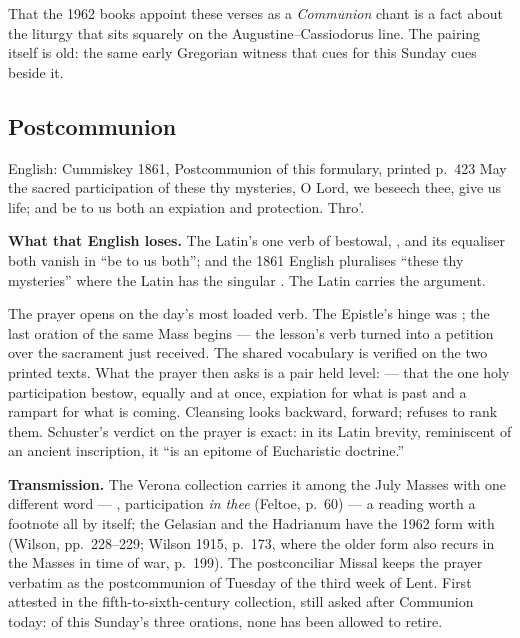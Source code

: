 That the 1962 books appoint these verses as a \textit{Communion} chant is a
fact about the liturgy that sits squarely on the Augustine--Cassiodorus line.
The pairing itself is old: the same early Gregorian witness
that cues  for this Sunday cues  beside it.

\elementguard
\subsection*{Postcommunion }


\begin{namedtranslation}{English: Cummiskey 1861, Postcommunion of this formulary, printed p.~423}
May the sacred participation of these thy mysteries, O Lord, we beseech thee,
give us life; and be to us both an expiation and protection. Thro'.
\end{namedtranslation}

\textbf{What that English loses.} The Latin's one verb of bestowal,
, and its equaliser  both vanish in ``be to us
both''; and the 1861 English pluralises ``these thy mysteries'' where the
Latin has the singular . The Latin carries the
argument.

The prayer opens on the day's most loaded verb. The Epistle's hinge was
; the last oration of the same Mass begins
 --- the lesson's verb turned into a petition over the
sacrament just received. The shared vocabulary is verified on the two
printed texts. What the prayer then asks is a pair held level:  --- that the one holy
participation bestow, equally and at once, expiation for what is past and a
rampart for what is coming. Cleansing looks backward, 
forward;  refuses to rank them. Schuster's verdict on the
prayer is exact: in its Latin brevity, reminiscent of an
ancient inscription, it ``is an epitome of Eucharistic doctrine.''

\textbf{Transmission.} The Verona collection
carries it among the July Masses with one different word --- , participation \textit{in thee}
(Feltoe, p.~60) --- a reading worth a footnote all by itself; the Gelasian
and the Hadrianum have the 1962 form with  (Wilson, pp.\
228--229; Wilson 1915, p.~173, where the older  form also
recurs in the Masses in time of war, p.~199). The postconciliar Missal keeps
the prayer verbatim as the postcommunion of Tuesday of the third week of
Lent. First attested in the fifth-to-sixth-century collection, still asked
after Communion today: of this Sunday's three orations, none has been
allowed to retire.
